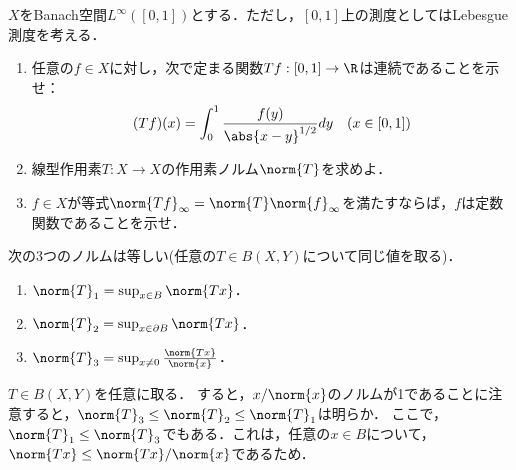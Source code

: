 \documentclass[uplatex,dvipdfmx]{jsarticle}
\begin{document}
\begin{tcolorbox}[colframe=ForestGreen, colback=ForestGreen!10!white,breakable,colbacktitle=ForestGreen!40!white,coltitle=black,fonttitle=\bfseries\sffamily,
    title=B 第9問（関数解析）]
    $X$をBanach空間$L^\infty([0,1])$とする．ただし，$[0,1]$上の測度としてはLebesgue測度を考える．
    \begin{enumerate}
        \item 任意の$f\in X$に対し，次で定まる関数$Tf:[0,1]\to\R$は連続であることを示せ：
        \[(Tf)(x)=\int^1_0\frac{f(y)}{\abs{x-y}^{1/2}}dy\quad(x\in[0,1])\]
        \item 線型作用素$T:X\to X$の作用素ノルム$\norm{T}$を求めよ．
        \item $f\in X$が等式$\norm{Tf}_\infty=\norm{T}\norm{f}_\infty$を満たすならば，$f$は定数関数であることを示せ．
    \end{enumerate}
\end{tcolorbox}
\begin{lemma}[作用素ノルムの特徴付け]
    次の3つのノルムは等しい(任意の$T\in B(X,Y)$について同じ値を取る)．
    \begin{enumerate}
        \item $\norm{T}_1=\sup_{x\in B}\norm{Tx}$．
        \item $\norm{T}_2=\sup_{x\in\partial B}\norm{Tx}$．
        \item $\norm{T}_3=\sup_{x\ne 0}\frac{\norm{Tx}}{\norm{x}}$．
    \end{enumerate}
\end{lemma}
\begin{Proof}
    $T\in B(X,Y)$を任意に取る．
    すると，$x/\norm{x}$のノルムが1であることに注意すると，$\norm{T}_3\le\norm{T}_2\le\norm{T}_1$は明らか．
    ここで，$\norm{T}_1\le\norm{T}_3$でもある．これは，任意の$x\in B$について，$\norm{Tx}\le\norm{Tx}/\norm{x}$であるため．
\end{Proof}
\end{document}
